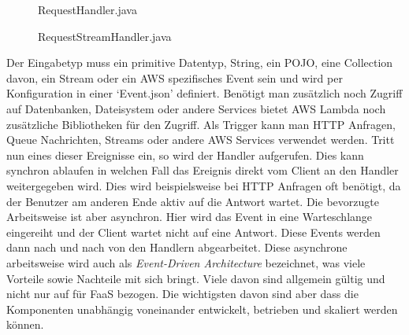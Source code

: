 \documentclass[12pt, a4paper]{article}
\begin{document}
\begin{figure}[h]
    
    \caption{RequestHandler.java}
\end{figure}

\begin{figure}[h]
    
    \caption{RequestStreamHandler.java}
\end{figure}
 
Der Eingabetyp muss ein primitive Datentyp, String, ein \ac{POJO}, eine Collection davon, ein Stream oder ein AWS spezifisches Event sein und wird per Konfiguration in einer `Event.json' definiert.
Benötigt man zusätzlich noch Zugriff auf Datenbanken, Dateisystem oder andere Services bietet \ac{AWS} Lambda noch zusätzliche Bibliotheken für den Zugriff.
\newline\newline
Als Trigger kann man HTTP Anfragen, Queue Nachrichten, Streams oder andere \ac{AWS} Services verwendet werden.
Tritt nun eines dieser Ereignisse ein, so wird der Handler aufgerufen.
Dies kann synchron ablaufen in welchen Fall das Ereignis direkt vom Client an den Handler weitergegeben wird.
Dies wird beispielsweise bei HTTP Anfragen oft benötigt, da der Benutzer am anderen Ende aktiv auf die Antwort wartet.
\newline
Die bevorzugte Arbeitsweise ist aber asynchron.
Hier wird das Event in eine Warteschlange eingereiht und der Client wartet nicht auf eine Antwort.
Diese Events werden dann nach und nach von den Handlern abgearbeitet.
Diese asynchrone arbeitsweise wird auch als \emph{Event-Driven Architecture} bezeichnet, was viele Vorteile sowie Nachteile mit sich bringt\cite{awsEventDrivenArchitecture}.
Viele davon sind allgemein gültig und nicht nur auf für \ac{FaaS} bezogen.
Die wichtigsten davon sind aber dass die Komponenten unabhängig voneinander entwickelt, betrieben und skaliert werden können.

\end{document}
